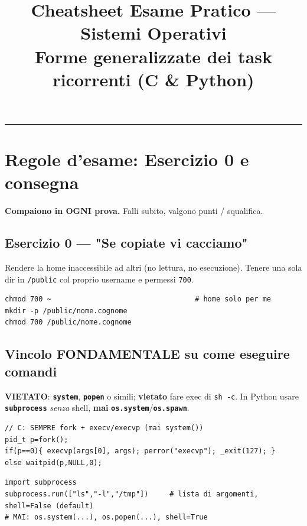 \documentclass[10pt,a4paper]{article}
\title{\vspace{-1.5cm}\textbf{Cheatsheet Esame Pratico --- Sistemi Operativi}\\[-2mm]
\large Forme generalizzate dei task ricorrenti (C \& Python)}
\author{}
\date{}
\newcommand{\fn}[1]{\texttt{\textbf{#1}}}
\begin{document}
\maketitle
\vspace{-0.8cm}
{\small\tableofcontents}
\vspace{0.3cm}
\hrule

\section{Regole d'esame: Esercizio 0 e consegna}
\textbf{Compaiono in OGNI prova.} Falli subito, valgono punti / squalifica.

\subsection{Esercizio 0 --- "Se copiate vi cacciamo"}
Rendere la home inaccessibile ad altri (no lettura, no esecuzione). Tenere una sola dir in \verb|/public| col proprio username e permessi \verb|700|.
\begin{lstlisting}[style=base]
chmod 700 ~                                  # home solo per me
mkdir -p /public/nome.cognome
chmod 700 /public/nome.cognome
\end{lstlisting}

\subsection{Vincolo FONDAMENTALE su come eseguire comandi}
\textbf{VIETATO}: \fn{system}, \fn{popen} o simili; \textbf{vietato} fare exec di \verb|sh -c|. In Python usare \fn{subprocess} \emph{senza} shell, \textbf{mai} \fn{os.system}/\fn{os.spawn}.
\begin{lstlisting}[style=c]
// C: SEMPRE fork + execv/execvp (mai system())
pid_t p=fork();
if(p==0){ execvp(args[0], args); perror("execvp"); _exit(127); }
else waitpid(p,NULL,0);
\end{lstlisting}
\begin{lstlisting}[style=py]
import subprocess
subprocess.run(["ls","-l","/tmp"])     # lista di argomenti, shell=False (default)
# MAI: os.system(...), os.popen(...), shell=True
\end{lstlisting}
\end{document}
